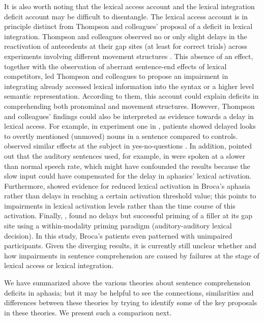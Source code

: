 \documentclass{cambridge7A}\usepackage[]{graphicx}\usepackage[]{color}
\begin{document}
It is also worth noting that the lexical access account and the lexical integration deficit account may be difficult to disentangle.
The lexical access account  
is in principle distinct from Thompson and colleagues' proposal of  a deficit in lexical integration. 
Thompson and colleagues observed no or only slight delays in the reactivation of antecedents at their gap sites (at least for correct trials) across experiments involving different movement structures \citep{ThompsonChoy-2009,Choy:2010,Meyer2012}. This absence of an effect, together with the observation of aberrant sentence-end effects of lexical competitors, led Thompson and colleagues to propose an impairment in integrating already accessed lexical information into the syntax or a higher level semantic representation. According to them, this account could explain deficits in comprehending both pronominal and movement structures.
However, Thompson and colleagues' findings could also be interpreted as evidence towards a delay in lexical access. For example, in experiment one in \cite{ThompsonChoy-2009} \citep[see also][]{Choy:2010}, patients showed delayed looks to overtly mentioned (unmoved) nouns in a sentence compared to controls. \cite{Dickey:2007a} observed similar effects at the subject in yes-no-questions \citep[see also experiment two reported in][]{ThompsonChoy-2009}. In addition, \cite{Love:2008} pointed out that the auditory sentences used, for example, in \cite{Dickey:2007a} were spoken at a slower than normal speech rate, which might have confounded the results because the slow input could have compensated for the delay in aphasics' lexical activation.
Furthermore, \cite{Yee2008} showed evidence for reduced lexical activation in Broca's aphasia rather than delays in reaching a certain activation threshold value; this points to impairments in lexical activation levels rather than the time course of this activation. Finally, \cite{Blumstein1998}, found no delays but successful priming of a filler at its gap site using a within-modality priming paradigm (auditory-auditory lexical decision). In this study, Broca's patients even patterned with unimpaired participants.
Given the diverging results, it is currently still unclear whether and how impairments in sentence comprehension are caused by failures at the stage of lexical access or lexical integration. 

We have summarized above the various theories about sentence comprehension deficits in aphasia; but it may be helpful to see the connections, similarities and differences between these theories by trying to identify some of the key proposals in these theories. We present such a comparison next.
\end{document}
